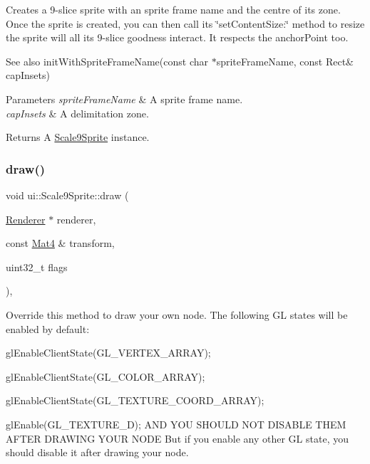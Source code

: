 Creates a 9-\/slice sprite with an sprite frame name and the centre of its zone. Once the sprite is created, you can then call its \char`\"{}set\+Content\+Size\+:\char`\"{} method to resize the sprite will all it\textquotesingle{}s 9-\/slice goodness interact. It respects the anchor\+Point too.

\begin{DoxySeeAlso}{See also}
init\+With\+Sprite\+Frame\+Name(const char $\ast$sprite\+Frame\+Name, const Rect\& cap\+Insets) 
\end{DoxySeeAlso}

\begin{DoxyParams}{Parameters}
{\em sprite\+Frame\+Name} & A sprite frame name. \\
\hline
{\em cap\+Insets} & A delimitation zone. \\
\hline
\end{DoxyParams}
\begin{DoxyReturn}{Returns}
A \hyperlink{classui_1_1Scale9Sprite}{Scale9\+Sprite} instance. 
\end{DoxyReturn}
\mbox{\label{classui_1_1Scale9Sprite_ae16122e957d7bc7de809d06006b7d6f3}} 
\subsubsection{\texorpdfstring{draw()}{draw()}}
{\footnotesize\ttfamily void ui\+::\+Scale9\+Sprite\+::draw (\begin{DoxyParamCaption}\item[{\hyperlink{classRenderer}{Renderer} $\ast$}]{renderer,  }\item[{const \hyperlink{classMat4}{Mat4} \&}]{transform,  }\item[{uint32\+\_\+t}]{flags }\end{DoxyParamCaption})\hspace{0.3cm}{\ttfamily [override]}, {\ttfamily [virtual]}}

Override this method to draw your own node. The following GL states will be enabled by default\+:
\begin{DoxyItemize}
\item {\ttfamily gl\+Enable\+Client\+State(\+G\+L\+\_\+\+V\+E\+R\+T\+E\+X\+\_\+\+A\+R\+R\+A\+Y);}
\item {\ttfamily gl\+Enable\+Client\+State(\+G\+L\+\_\+\+C\+O\+L\+O\+R\+\_\+\+A\+R\+R\+A\+Y);}
\item {\ttfamily gl\+Enable\+Client\+State(\+G\+L\+\_\+\+T\+E\+X\+T\+U\+R\+E\+\_\+\+C\+O\+O\+R\+D\+\_\+\+A\+R\+R\+A\+Y);}
\item {\ttfamily gl\+Enable(\+G\+L\+\_\+\+T\+E\+X\+T\+U\+R\+E\+\_\+D);} A\+ND Y\+OU S\+H\+O\+U\+LD N\+OT D\+I\+S\+A\+B\+LE T\+H\+EM A\+F\+T\+ER D\+R\+A\+W\+I\+NG Y\+O\+UR N\+O\+DE But if you enable any other GL state, you should disable it after drawing your node.
\end{DoxyItemize}


